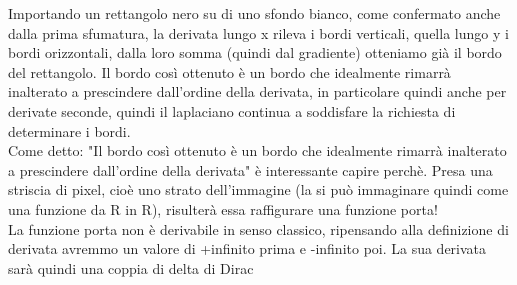 Importando un rettangolo nero su di uno sfondo bianco, come confermato anche dalla prima sfumatura, la derivata lungo x rileva i bordi verticali, quella lungo y i bordi orizzontali, dalla loro somma (quindi dal gradiente) otteniamo già il bordo del rettangolo.
Il bordo così ottenuto è un bordo che idealmente rimarrà inalterato a prescindere dall'ordine della derivata, in particolare quindi anche per derivate seconde, quindi il laplaciano continua a soddisfare la richiesta di determinare i bordi. \\
Come detto: "Il bordo così ottenuto è un bordo che idealmente rimarrà inalterato a prescindere dall'ordine della derivata" è interessante capire perchè. Presa una striscia di pixel, cioè uno strato dell'immagine (la si può immaginare quindi come una funzione da R in R), risulterà essa raffigurare una funzione porta!\\
La funzione porta non è derivabile in senso classico, ripensando alla definizione di derivata avremmo un valore di +infinito prima e -infinito poi. La sua derivata sarà quindi una coppia di delta di Dirac\\

